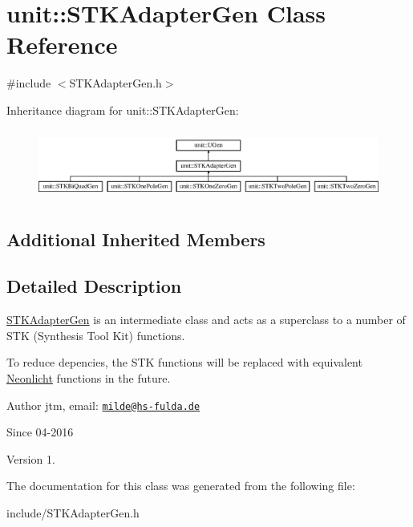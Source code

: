 \hypertarget{classunit_1_1STKAdapterGen}{\section{unit\-:\-:S\-T\-K\-Adapter\-Gen Class Reference}
\label{classunit_1_1STKAdapterGen}
}


{\ttfamily \#include $<$S\-T\-K\-Adapter\-Gen.\-h$>$}

Inheritance diagram for unit\-:\-:S\-T\-K\-Adapter\-Gen\-:\begin{figure}[H]
\begin{center}
\leavevmode
\includegraphics[height=2.333333cm]{classunit_1_1STKAdapterGen}
\end{center}
\end{figure}
\subsection*{Additional Inherited Members}


\subsection{Detailed Description}
\hyperlink{classunit_1_1STKAdapterGen}{S\-T\-K\-Adapter\-Gen} is an intermediate class and acts as a superclass to a number of S\-T\-K (Synthesis Tool Kit) functions.

To reduce depencies, the S\-T\-K functions will be replaced with equivalent \hyperlink{classNeonlicht}{Neonlicht} functions in the future.

\begin{DoxyAuthor}{Author}
jtm, email\-:  \href{mailto:milde@hs-fulda.de}{\tt milde@hs-\/fulda.\-de} 
\end{DoxyAuthor}
\begin{DoxySince}{Since}
04-\/2016 
\end{DoxySince}
\begin{DoxyVersion}{Version}
1. 
\end{DoxyVersion}


The documentation for this class was generated from the following file\-:\begin{DoxyCompactItemize}
\item 
include/S\-T\-K\-Adapter\-Gen.\-h\end{DoxyCompactItemize}
